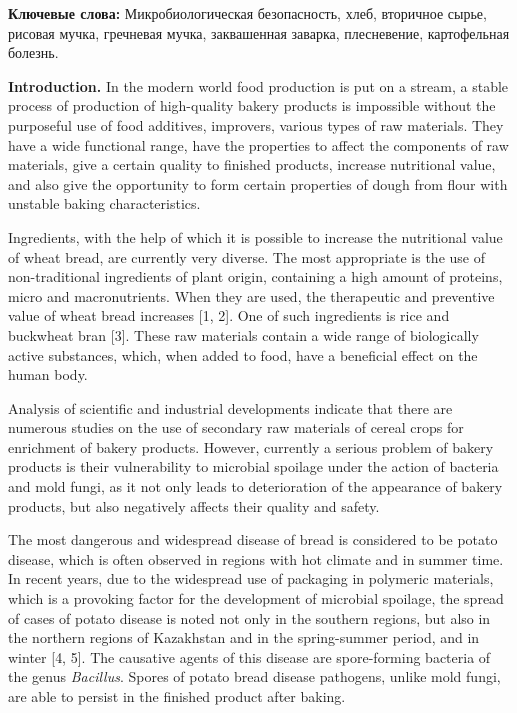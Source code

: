 {\bfseries Ключевые слова:} Микробиологическая безопасность, хлеб,
вторичное сырье, рисовая мучка, гречневая мучка, заквашенная заварка,
плесневение, картофельная болезнь.

{\bfseries Introduction.} In the modern world food production is put on a
stream, a stable process of production of high-quality bakery products
is impossible without the purposeful use of food additives, improvers,
various types of raw materials. They have a wide functional range, have
the properties to affect the components of raw materials, give a certain
quality to finished products, increase nutritional value, and also give
the opportunity to form certain properties of dough from flour with
unstable baking characteristics.

Ingredients, with the help of which it is possible to increase the
nutritional value of wheat bread, are currently very diverse. The most
appropriate is the use of non-traditional ingredients of plant origin,
containing a high amount of proteins, micro and macronutrients. When
they are used, the therapeutic and preventive value of wheat bread
increases {[}1, 2{]}. One of such ingredients is rice and buckwheat bran
{[}3{]}. These raw materials contain a wide range of biologically active
substances, which, when added to food, have a beneficial effect on the
human body.

Analysis of scientific and industrial developments indicate that there
are numerous studies on the use of secondary raw materials of cereal
crops for enrichment of bakery products. However, currently a serious
problem of bakery products is their vulnerability to microbial spoilage
under the action of bacteria and mold fungi, as it not only leads to
deterioration of the appearance of bakery products, but also negatively
affects their quality and safety.

The most dangerous and widespread disease of bread is considered to be
potato disease, which is often observed in regions with hot climate and
in summer time. In recent years, due to the widespread use of packaging
in polymeric materials, which is a provoking factor for the development
of microbial spoilage, the spread of cases of potato disease is noted
not only in the southern regions, but also in the northern regions of
Kazakhstan and in the spring-summer period, and in winter {[}4, 5{]}.
The causative agents of this disease are spore-forming bacteria of the
genus \emph{Bacillus}. Spores of potato bread disease pathogens, unlike
mold fungi, are able to persist in the finished product after baking.

